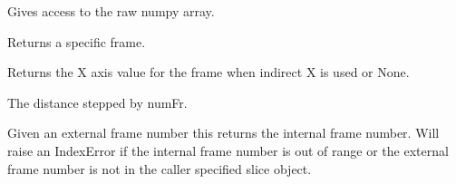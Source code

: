 \documentclass[letterpaper,10pt,english]{sphinxmanual}
\begin{document}
\begin{fulllineitems}

\begin{fulllineitems}
\label{\detokenize{ref/LIS/core/FrameSet:TotalDepth.LIS.core.FrameSet.FrameSet.frames}}
Gives access to the raw numpy array.

\end{fulllineitems}


\begin{fulllineitems}
\label{\detokenize{ref/LIS/core/FrameSet:TotalDepth.LIS.core.FrameSet.FrameSet.frame}}
Returns a specific frame.

\end{fulllineitems}


\begin{fulllineitems}
\label{\detokenize{ref/LIS/core/FrameSet:TotalDepth.LIS.core.FrameSet.FrameSet.xAxisValue}}
Returns the X axis value for the frame when indirect X is used or None.

\end{fulllineitems}


\begin{fulllineitems}
\label{\detokenize{ref/LIS/core/FrameSet:TotalDepth.LIS.core.FrameSet.FrameSet.xAxisStep}}
The distance stepped by numFr.

\end{fulllineitems}


\begin{fulllineitems}
\label{\detokenize{ref/LIS/core/FrameSet:TotalDepth.LIS.core.FrameSet.FrameSet.intFrameNum}}
Given an external frame number this returns the internal frame number.
Will raise an IndexError if the internal frame number is out of
range or the external frame number is not in the caller specified
slice object.


\end{fulllineitems}
\end{fulllineitems}
\end{document}

